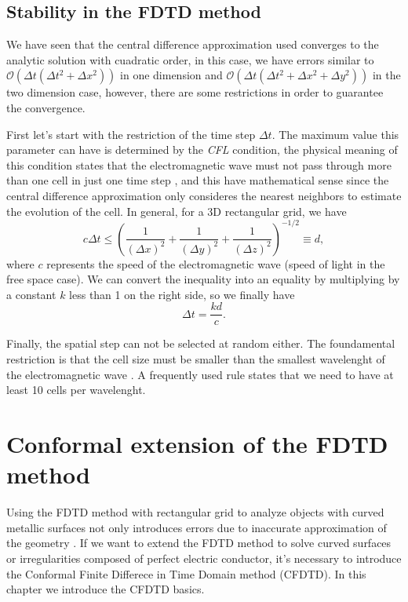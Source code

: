 \documentclass[12pt, oneside]{book}
\begin{document}
\section{Stability in the FDTD method}

We have seen that the central difference approximation used converges to the analytic solution with cuadratic order, in this case, we have errors similar to $\mathcal{O}(\Delta t(\Delta t^2 + \Delta x^2))$ in one dimension and $\mathcal{O}(\Delta t(\Delta t^2 + \Delta x^2 + \Delta y^2))$ in the two dimension case, however, there are some restrictions in order to guarantee the convergence.

\indent First let's start with the restriction of the time step $\Delta t$. The maximum value this parameter can have is determined by the \textit{CFL} condition, the physical meaning of this condition states that the electromagnetic wave must not pass through more than one cell in just one time step \cite{kunz1993finite}, and this have mathematical sense since the central difference approximation only consideres the nearest neighbors to estimate the evolution of the cell. In general, for a 3D rectangular grid, we have
\begin{equation}
    c \Delta t \leq \left( \dfrac{1}{(\Delta x)^2} + \dfrac{1}{(\Delta y)^2} + \dfrac{1}{(\Delta z)^2} \right)^{-1/2} \equiv d,
\end{equation}
where $c$ represents the speed of the electromagnetic wave (speed of light in the free space case). We can convert the inequality into an equality by multiplying by a constant $k$ less than 1 on the right side, so we finally have
\begin{equation}
    \Delta t = \dfrac{kd}{c}.
    \label{eq:CFL}
\end{equation}

Finally, the spatial step can not be selected at random either. The foundamental restriction is that the cell size must be smaller than the smallest wavelenght of the electromagnetic wave \cite{kunz1993finite}. A frequently used rule states that we need to have at least 10 cells per wavelenght.

\chapter{Conformal extension of the FDTD method}

Using the FDTD method with rectangular grid to analyze objects with curved metallic surfaces not only introduces errors due to inaccurate approximation of the geometry \cite{97384}. If we want to extend the FDTD method to solve curved surfaces or irregularities composed of perfect electric conductor, it's necessary to introduce the Conformal Finite Differece in Time Domain method (CFDTD). In this chapter we introduce the CFDTD basics.
\end{document}
